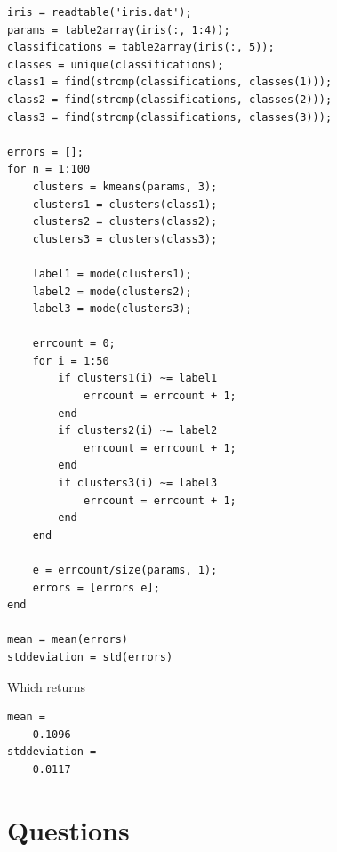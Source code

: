 \documentclass[11pt]{article}
\begin{document}
   \begin{lstlisting}
iris = readtable('iris.dat');
params = table2array(iris(:, 1:4));
classifications = table2array(iris(:, 5));
classes = unique(classifications);
class1 = find(strcmp(classifications, classes(1)));
class2 = find(strcmp(classifications, classes(2)));
class3 = find(strcmp(classifications, classes(3)));

errors = [];
for n = 1:100
    clusters = kmeans(params, 3);
    clusters1 = clusters(class1);
    clusters2 = clusters(class2);
    clusters3 = clusters(class3);

    label1 = mode(clusters1);
    label2 = mode(clusters2);
    label3 = mode(clusters3);

    errcount = 0;
    for i = 1:50
        if clusters1(i) ~= label1
            errcount = errcount + 1;
        end
        if clusters2(i) ~= label2
            errcount = errcount + 1;
        end
        if clusters3(i) ~= label3
            errcount = errcount + 1;
        end
    end

    e = errcount/size(params, 1);
    errors = [errors e];
end

mean = mean(errors)
stddeviation = std(errors)\end{lstlisting}

    Which returns
    
    \begin{lstlisting}
mean =
    0.1096
stddeviation =
    0.0117\end{lstlisting}



\section{Questions}
\end{document}
